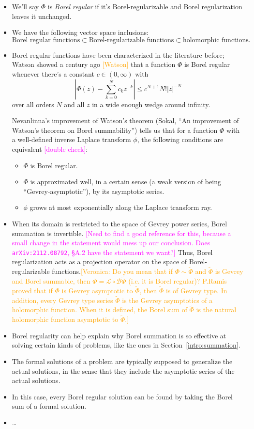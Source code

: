 \documentclass{article}
\begin{document}
\begin{itemize}
\item We'll say $\Phi$ is {\em Borel regular} if it's Borel-regularizable and Borel regularization leaves it unchanged.
\item We have the following vector space inclusions:
\[ \text{Borel regular functions} \subset \text{Borel-regularizable functions} \subset \text{holomorphic functions}. \]
\item Borel regular functions have been characterized in the literature before; Watson showed a century ago \textcolor{orange}{[Watson]} that a function $\Phi$ is Borel regular whenever there's a constant $c \in (0, \infty)$ with
\[ |\Phi(z)-\sum_{k=0}^Nc_kz^{-k}| \le c^{N+1} N!|z|^{-N} \]
over all orders $N$ and all $z$ in a wide enough wedge around infinity. 

Nevanlinna's improvement of Watson's theorem (Sokal, ``An improvement of Watson's theorem on Borel summability'') tells us that for a function $\Phi$ with a well-defined inverse Laplace transform $\phi$, the following conditions are equivalent \textcolor{magenta}{[double check]}:
\begin{itemize}
\item $\Phi$ is Borel regular.
\item $\Phi$ is approximated well, in a certain sense (a weak version of being ``Gevrey-asymptotic''), by its asymptotic series.
\item $\phi$ grows at most exponentially along the Laplace transform ray.
\end{itemize}
\item When its domain is restricted to the space of Gevrey power series, Borel summation is invertible. \textcolor{magenta}{[Need to find a good reference for this, because a small change in the statement would mess up our conclusion. Does \texttt{arXiv:2112.08792}, \S A.2 have the statement we want?]} Thus, Borel regularization acts as a projection operator on the space of Borel-regularizable functions.\textcolor{orange}{[Veronica: Do you mean that if $\Phi\sim\tilde{\Phi}$ and $\tilde{\Phi}$ is Gevrey and Borel summable, then $\Phi=\mathcal{L}\circ\mathcal{B}\tilde{\Phi}$ (i.e. it is Borel regular)? P.Ramis proved that if $\Phi$ is Gevrey asymptotic to $\tilde{\Phi}$, then $\tilde{\Phi}$ is of Gevrey type. In addition, every Gevrey type series $\tilde{\Phi}$ is the Gevrey asymptotics of a holomorphic function. When it is defined, the Borel sum of $\tilde{\Phi}$ is the natural holomorphic function asymptotic to $\tilde{\Phi}$.]}
\item Borel regularity can help explain why Borel summation is so effective at solving certain kinds of problems, like the ones in Section~\ref{intro:summation}.
\item The formal solutions of a problem are typically supposed to generalize the actual solutions, in the sense that they include the asymptotic series of the actual solutions.
\item In this case, every Borel regular solution can be found by taking the Borel sum of a formal solution.
\item \ldots
\end{itemize}
\end{document}
